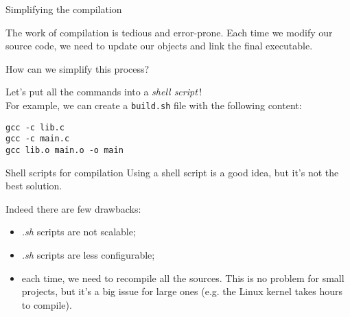 \begin{frame}[fragile]{Simplifying the compilation}

    The work of compilation is tedious and error-prone. Each time we modify our source code, we need to update our objects and link the final executable.

    How can we simplify this process?

    Let's put all the commands into a \emph{shell script}$\,$! \\
    For example, we can create a \texttt{build.sh} file with the following content:
    \begin{lstlisting}
gcc -c lib.c 
gcc -c main.c 
gcc lib.o main.o -o main \end{lstlisting}
\end{frame}

\begin{frame}[fragile]{Shell scripts for compilation}
    Using a shell script is a good idea, but it's not the best solution.

    Indeed there are few drawbacks:
    \begin{itemize}
        \item \textit{.sh} scripts are not scalable;
        \item \textit{.sh} scripts are less configurable;
        \item each time, we need to recompile all the sources. This is no problem for small projects, but it's a big issue for large ones (e.g. the Linux kernel takes hours to compile).
    \end{itemize}
\end{frame}
